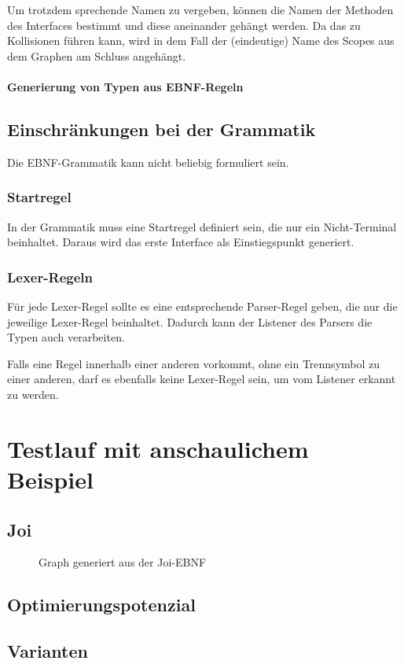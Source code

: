 \documentclass[../InterneDSLs.tex]{subfiles}
\begin{document}
Um trotzdem sprechende Namen zu vergeben, können die Namen der Methoden des Interfaces bestimmt und diese aneinander gehängt werden. Da das zu Kollisionen führen kann, wird in dem Fall der (eindeutige) Name des Scopes aus dem Graphen am Schluss angehängt.

\subsubsection{Generierung von Typen aus EBNF-Regeln}


\section{Einschränkungen bei der Grammatik}
Die EBNF-Grammatik kann nicht beliebig formuliert sein.

\subsection{Startregel}
In der Grammatik muss eine Startregel definiert sein, die nur ein Nicht-Terminal beinhaltet. Daraus wird das erste Interface als Einstiegspunkt generiert.

\subsection{Lexer-Regeln}
Für jede Lexer-Regel sollte es eine entsprechende Parser-Regel geben, die nur die jeweilige Lexer-Regel beinhaltet. Dadurch kann der Listener des Parsers die Typen auch verarbeiten.

Falls eine Regel innerhalb einer anderen vorkommt, ohne ein Trennsymbol zu einer anderen, darf es ebenfalls keine Lexer-Regel sein, um vom Listener erkannt zu werden.


\chapter{Testlauf mit anschaulichem Beispiel}

\section{Joi}
\begin{figure}[ht]
    
\end{figure}
\begin{figure}[ht]
\centering
\resizebox{0.5\linewidth}{!}{}
\caption{Graph generiert aus der Joi-EBNF}
\label{FIG:JoiGraph}
\end{figure}

\section{Optimierungspotenzial}


\section{Varianten}
\end{document}
